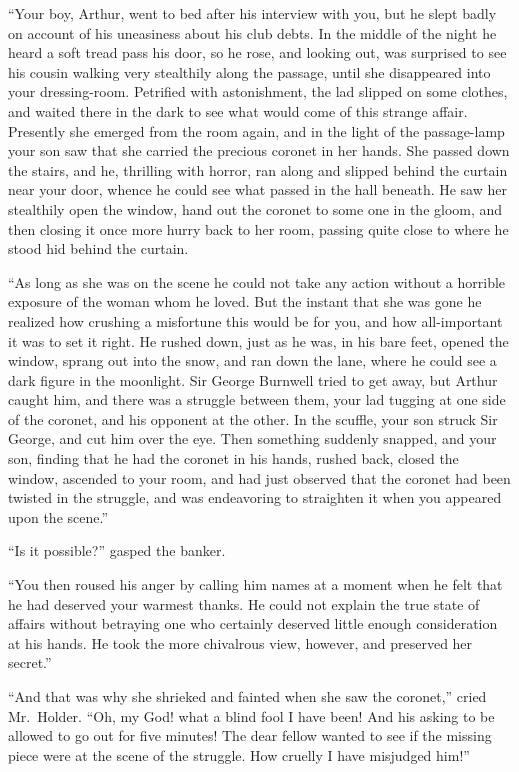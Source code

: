 “Your boy, Arthur, went to bed after his interview with
you, but he slept badly on account of his uneasiness about his
club debts. In the middle of the night he heard a soft tread
pass his door, so he rose, and looking out, was surprised to see
his cousin walking very stealthily along the passage, until she
disappeared into your dressing-room. Petrified with astonishment,
the lad slipped on some clothes, and waited there in the
dark to see what would come of this strange affair. Presently
she emerged from the room again, and in the light of the
passage-lamp your son saw that she carried the precious coronet
in her hands. She passed down the stairs, and he, thrilling
with horror, ran along and slipped behind the curtain near
your door, whence he could see what passed in the hall beneath.
He saw her stealthily open the window, hand out the
coronet to some one in the gloom, and then closing it once
more hurry back to her room, passing quite close to where he
stood hid behind the curtain.

“As long as she was on the scene he could not take any
action without a horrible exposure of the woman whom he
loved. But the instant that she was gone he realized how
crushing a misfortune this would be for you, and how all-important
it was to set it right. He rushed down, just as he
was, in his bare feet, opened the window, sprang out into the
snow, and ran down the lane, where he could see a dark figure
in the moonlight. Sir George Burnwell tried to get away, but
Arthur caught him, and there was a struggle between them,
your lad tugging at one side of the coronet, and his opponent
at the other. In the scuffle, your son struck Sir George, and
cut him over the eye. Then something suddenly snapped, and
your son, finding that he had the coronet in his hands, rushed
back, closed the window, ascended to your room, and had just
observed that the coronet had been twisted in the struggle,
and was endeavoring to straighten it when you appeared upon
the scene.”

“Is it possible?” gasped the banker.

“You then roused his anger by calling him names at a moment
when he felt that he had deserved your warmest thanks.
He could not explain the true state of affairs without betraying
one who certainly deserved little enough consideration at
his hands. He took the more chivalrous view, however, and
preserved her secret.”

“And that was why she shrieked and fainted when she saw
the coronet,” cried Mr.~Holder. “Oh, my God! what a blind
fool I have been! And his asking to be allowed to go out for
five minutes! The dear fellow wanted to see if the missing
piece were at the scene of the struggle. How cruelly I have
misjudged him!”

